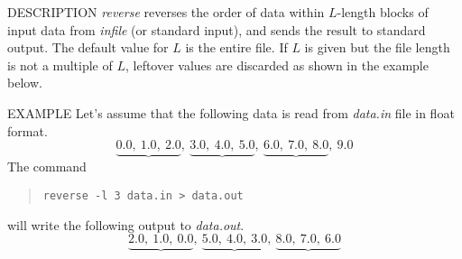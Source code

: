 \begin{synopsis}
\item[reverse] [ --l $L$ ] [ --n $N$ ] [ {\em infile} ]
\end{synopsis}

\begin{qsection}{DESCRIPTION}
{\em reverse} reverses the order of data within $L$-length blocks 
of input data from {\em infile} (or standard input), 
and sends the result to standard output. 
The default value for $L$ is the entire file. 
If $L$ is given but the file length is not a multiple of $L$, 
leftover values are discarded as shown in the example below.
\end{qsection}

\begin{options}
\end{options}

\begin{qsection}{EXAMPLE}
Let's assume that the following data
is read from {\em data.in} file in float format.
\begin{displaymath}
 \underbrace{0.0, ~1.0, ~2.0}, ~
 \underbrace{3.0, ~4.0, ~5.0}, ~
 \underbrace{6.0, ~7.0, ~8.0}, ~9.0
\end{displaymath}
The command
\begin{quote}
\verb!reverse -l 3 data.in > data.out!
\end{quote}
will write the following output to {\em data.out}.
\begin{displaymath}
 \underbrace{2.0, ~1.0, ~0.0}, ~
 \underbrace{5.0, ~4.0, ~3.0}, ~
 \underbrace{8.0, ~7.0, ~6.0}
\end{displaymath}
\end{qsection}
